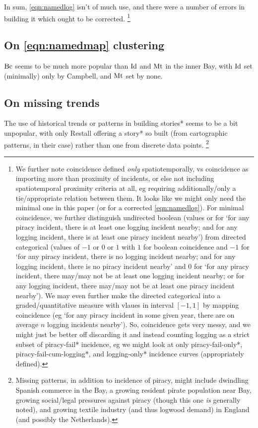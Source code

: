 		In sum, \ref{eqn:namedlog} isn't of much use, and there were a number of errors in building it which ought to be corrected.%
		\footnote{We further note coincidence defined \emph{only} spatiotemporally, vs coincidence as importing more than proximity of incidents, or else not including spatiotemporal proximity criteria at all, eg requiring additionally/only a tie/appropriate relation between them. It looks like we might only need the minimal one in this paper (or for a corrected \ref{eqn:namedlog}). For minimal coincidence, we further distinguish undirected boolean (values  or  for `for any piracy incident, there is at least one logging incident nearby; and for any logging incident, there is at least one piracy incident nearby') from directed categorical (values of \(-1\) or \(0\) or \(1\) with \(1\) for boolean coincidence and \(-1\) for `for any piracy incident, there is no logging incident nearby; and for any logging incident, there is no piracy incident nearby' and \(0\) for `for any piracy incident, there may/may not be at least one logging incident nearby; or for any logging incident, there may/may not be at least one piracy incident nearby'). We may even further make the directed categorical into a graded/quantitative measure with vlaues in interval \([-1,1]\) by mapping coincidence  (eg `for any piracy incident in some given year, there are on average \(n\) logging incidents nearby'). So, coincidence gets very messy, and we might just be better off discarding it and instead counting logging as a strict subset of piracy-fail* incidence, eg we might look at only piracy-fail-only*, piracy-fail-cum-logging*, and logging-only* incidence curves (appropriately defined).}
	\subsection{On \ref{eqn:namedmap} clustering}
	\label{ss:onmapclusters}
		\(\operatorname{Bc}\) seems to be much more popular than \(\operatorname{Id}\) and \(\operatorname{Mt}\) in the inner Bay, with \(\operatorname{Id}\) set (minimally) only by Campbell, and \(\operatorname{Mt}\) set by none.
	\subsection{On missing trends}
	\label{ss:onmissgtrends}
		The use of historical trends or patterns in building stories* seems to be a bit unpopular, with only Restall offering a story* so built (from cartographic patterns, in their case) rather than one from discrete data points.%
		\footnote{Missing patterns, in addition to incidence of piracy, might include dwindling Spanish commerce in the Bay, a growing resident pirate population near Bay, growing social/legal pressures against piracy (though this one \emph{is} generally noted), and growing textile industry (and thus logwood demand) in England (and possibly the Netherlands).}
